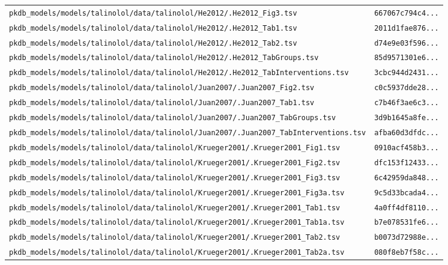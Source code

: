 \begin{longtable}{ll}
\texttt{pkdb\_models/models/talinolol/data/talinolol/He2012/.He2012\_Fig3.tsv} & \texttt{667067c794c4...} \\
\texttt{pkdb\_models/models/talinolol/data/talinolol/He2012/.He2012\_Tab1.tsv} & \texttt{2011d1fae876...} \\
\texttt{pkdb\_models/models/talinolol/data/talinolol/He2012/.He2012\_Tab2.tsv} & \texttt{d74e9e03f596...} \\
\texttt{pkdb\_models/models/talinolol/data/talinolol/He2012/.He2012\_TabGroups.tsv} & \texttt{85d9571301e6...} \\
\texttt{pkdb\_models/models/talinolol/data/talinolol/He2012/.He2012\_TabInterventions.tsv} & \texttt{3cbc944d2431...} \\
\texttt{pkdb\_models/models/talinolol/data/talinolol/Juan2007/.Juan2007\_Fig2.tsv} & \texttt{c0c5937dde28...} \\
\texttt{pkdb\_models/models/talinolol/data/talinolol/Juan2007/.Juan2007\_Tab1.tsv} & \texttt{c7b46f3ae6c3...} \\
\texttt{pkdb\_models/models/talinolol/data/talinolol/Juan2007/.Juan2007\_TabGroups.tsv} & \texttt{3d9b1645a8fe...} \\
\texttt{pkdb\_models/models/talinolol/data/talinolol/Juan2007/.Juan2007\_TabInterventions.tsv} & \texttt{afba60d3dfdc...} \\
\texttt{pkdb\_models/models/talinolol/data/talinolol/Krueger2001/.Krueger2001\_Fig1.tsv} & \texttt{0910acf458b3...} \\
\texttt{pkdb\_models/models/talinolol/data/talinolol/Krueger2001/.Krueger2001\_Fig2.tsv} & \texttt{dfc153f12433...} \\
\texttt{pkdb\_models/models/talinolol/data/talinolol/Krueger2001/.Krueger2001\_Fig3.tsv} & \texttt{6c42959da848...} \\
\texttt{pkdb\_models/models/talinolol/data/talinolol/Krueger2001/.Krueger2001\_Fig3a.tsv} & \texttt{9c5d33bcada4...} \\
\texttt{pkdb\_models/models/talinolol/data/talinolol/Krueger2001/.Krueger2001\_Tab1.tsv} & \texttt{4a0ff4df8110...} \\
\texttt{pkdb\_models/models/talinolol/data/talinolol/Krueger2001/.Krueger2001\_Tab1a.tsv} & \texttt{b7e078531fe6...} \\
\texttt{pkdb\_models/models/talinolol/data/talinolol/Krueger2001/.Krueger2001\_Tab2.tsv} & \texttt{b0073d72988e...} \\
\texttt{pkdb\_models/models/talinolol/data/talinolol/Krueger2001/.Krueger2001\_Tab2a.tsv} & \texttt{080f8eb7f58c...} \\

\end{longtable}
